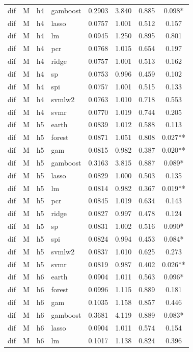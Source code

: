 \begin{ThreePartTable}
\begin{longtable}[t]{llclcccc}
dif & M & h4 & gamboost & 0.2903 & 3.840 & 0.885 & 0.098*\\
dif & M & h4 & lasso & 0.0757 & 1.001 & 0.512 & 0.157\\
dif & M & h4 & lm & 0.0945 & 1.250 & 0.895 & 0.801\\
dif & M & h4 & pcr & 0.0768 & 1.015 & 0.654 & 0.197\\
dif & M & h4 & ridge & 0.0757 & 1.001 & 0.513 & 0.162\\
dif & M & h4 & sp & 0.0753 & 0.996 & 0.459 & 0.102\\
dif & M & h4 & spi & 0.0757 & 1.001 & 0.515 & 0.133\\
dif & M & h4 & svmlw2 & 0.0763 & 1.010 & 0.718 & 0.553\\
dif & M & h4 & svmr & 0.0770 & 1.019 & 0.744 & 0.205\\
\addlinespace
dif & M & h5 & earth & 0.0839 & 1.012 & 0.588 & 0.113\\
dif & M & h5 & forest & 0.0871 & 1.051 & 0.808 & 0.027**\\
dif & M & h5 & gam & 0.0815 & 0.982 & 0.387 & 0.020**\\
dif & M & h5 & gamboost & 0.3163 & 3.815 & 0.887 & 0.089*\\
dif & M & h5 & lasso & 0.0829 & 1.000 & 0.503 & 0.135\\
dif & M & h5 & lm & 0.0814 & 0.982 & 0.367 & 0.019**\\
dif & M & h5 & pcr & 0.0845 & 1.019 & 0.634 & 0.143\\
dif & M & h5 & ridge & 0.0827 & 0.997 & 0.478 & 0.124\\
dif & M & h5 & sp & 0.0831 & 1.002 & 0.516 & 0.090*\\
dif & M & h5 & spi & 0.0824 & 0.994 & 0.453 & 0.084*\\
dif & M & h5 & svmlw2 & 0.0837 & 1.010 & 0.625 & 0.273\\
dif & M & h5 & svmr & 0.0819 & 0.987 & 0.402 & 0.026**\\
\addlinespace
dif & M & h6 & earth & 0.0904 & 1.011 & 0.563 & 0.096*\\
dif & M & h6 & forest & 0.0996 & 1.115 & 0.889 & 0.181\\
dif & M & h6 & gam & 0.1035 & 1.158 & 0.857 & 0.446\\
dif & M & h6 & gamboost & 0.3681 & 4.119 & 0.889 & 0.083*\\
dif & M & h6 & lasso & 0.0904 & 1.011 & 0.574 & 0.154\\
dif & M & h6 & lm & 0.1017 & 1.138 & 0.824 & 0.396\\

\end{longtable}
\end{ThreePartTable}
